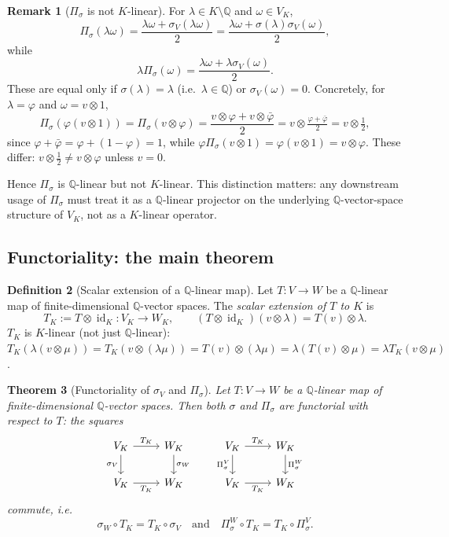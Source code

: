 \documentclass[11pt, a4paper]{amsart}
\newtheorem{theorem}{Theorem}[section]
\theoremstyle{definition}
\newtheorem{definition}[theorem]{Definition}
\newtheorem{remark}[theorem]{Remark}
\newcommand{\Q}{\mathbb{Q}}
\newcommand{\id}{\operatorname{id}}
\begin{document}
\begin{remark}[$\Pi_\sigma$ is not $K$-linear]
\label{rmk:pisigma-not-Klinear}
For $\lambda \in K \setminus \Q$ and $\omega \in V_K$,
\[
  \Pi_\sigma(\lambda \omega)
  = \frac{\lambda\omega + \sigma_V(\lambda\omega)}{2}
  = \frac{\lambda\omega + \sigma(\lambda) \sigma_V(\omega)}{2},
\]
while
\[
  \lambda \Pi_\sigma(\omega)
  = \frac{\lambda\omega + \lambda \sigma_V(\omega)}{2}.
\]
These are equal only if $\sigma(\lambda) = \lambda$ (i.e.\ $\lambda
\in \Q$) or $\sigma_V(\omega) = 0$. Concretely, for $\lambda =
\varphi$ and $\omega = v \otimes 1$,
\[
  \Pi_\sigma(\varphi (v \otimes 1))
  = \Pi_\sigma(v \otimes \varphi)
  = \frac{v \otimes \varphi + v \otimes \bar\varphi}{2}
  = v \otimes \tfrac{\varphi + \bar\varphi}{2}
  = v \otimes \tfrac{1}{2},
\]
since $\varphi + \bar\varphi = \varphi + (1-\varphi) = 1$, while
$\varphi \Pi_\sigma(v \otimes 1) = \varphi (v \otimes 1) = v \otimes
\varphi$. These differ: $v \otimes \tfrac{1}{2} \neq v \otimes
\varphi$ unless $v = 0$.

Hence $\Pi_\sigma$ is $\Q$-linear but not $K$-linear. This
distinction matters: any downstream usage of $\Pi_\sigma$ must
treat it as a $\Q$-linear projector on the underlying
$\Q$-vector-space structure of $V_K$, not as a $K$-linear operator.
\end{remark}

\subsection{Functoriality: the main theorem}

\begin{definition}[Scalar extension of a $\Q$-linear map]
\label{def:TK}
Let $T \colon V \to W$ be a $\Q$-linear map of finite-dimensional
$\Q$-vector spaces. The \emph{scalar extension of $T$ to $K$} is
\[
  T_K := T \otimes \id_K \colon V_K \to W_K,
  \qquad (T \otimes \id_K)(v \otimes \lambda) = T(v) \otimes \lambda.
\]
$T_K$ is $K$-linear (not just $\Q$-linear): $T_K(\lambda(v \otimes
\mu)) = T_K(v \otimes (\lambda\mu)) = T(v) \otimes (\lambda\mu) =
\lambda(T(v) \otimes \mu) = \lambda T_K(v \otimes \mu)$.
\end{definition}

\begin{theorem}[Functoriality of $\sigma_V$ and $\Pi_\sigma$]
\label{thm:pisigma-functorial}
Let $T \colon V \to W$ be a $\Q$-linear map of finite-dimensional
$\Q$-vector spaces. Then both $\sigma$ and $\Pi_\sigma$ are
functorial with respect to $T$: the squares
\[
\begin{tikzcd}
  V_K \arrow[r, "T_K"] \arrow[d, "\sigma_V"'] & W_K \arrow[d, "\sigma_W"] \\
  V_K \arrow[r, "T_K"'] & W_K
\end{tikzcd}
\qquad
\begin{tikzcd}
  V_K \arrow[r, "T_K"] \arrow[d, "\Pi_\sigma^V"'] & W_K \arrow[d, "\Pi_\sigma^W"] \\
  V_K \arrow[r, "T_K"'] & W_K
\end{tikzcd}
\]
commute, i.e.\
\[
  \sigma_W \circ T_K = T_K \circ \sigma_V
  \quad \text{and} \quad
  \Pi_\sigma^W \circ T_K = T_K \circ \Pi_\sigma^V.
\]
\end{theorem}
\end{document}
